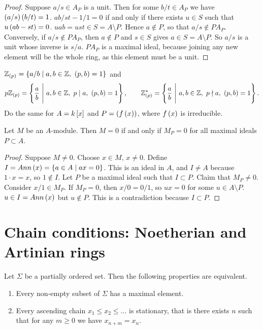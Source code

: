 \begin{proof}
Suppose $ a / s \in A_P $ is a unit. Then for some $ b / t \in A_P $ we have $ \rb{a / s}\rb{b / t} = 1 $. $ ab / st - 1 / 1 = 0 $ if and only if there exists $ u \in S $ such that $ u\rb{ab - st} = 0 $. $ uab = ust \in S = A \setminus P $. Hence $ a \notin P $, so that $ a / s \notin PA_P $. Conversely, if $ a / s \notin PA_P $, then $ a \notin P $ and $ s \in S $ gives $ a \in S = A \setminus P $. So $ a / s $ is a unit whose inverse is $ s / a $. $ PA_P $ is a maximal ideal, because joining any new element will be the whole ring, as this element must be a unit.
\end{proof}

\begin{example*}
$ \Z_{\rb{p}} = \cb{a / b \mid a, b \in \Z, \ \rb{p, b} = 1} $ and
$$ p\Z_{\rb{p}} = \cb{\dfrac{a}{b} \ \Bigg| \ a, b \in \Z, \ p \mid a, \ \rb{p, b} = 1}, \qquad \Z_{\rb{p}}^* = \cb{\dfrac{a}{b} \ \Bigg| \ a, b \in \Z, \ p \nmid a, \ \rb{p, b} = 1}. $$
Do the same for $ A = k\sb{x} $ and $ P = \rb{f\rb{x}} $, where $ f\rb{x} $ is irreducible.
\end{example*}

\begin{proposition}
Let $ M $ be an $ A $-module. Then $ M = 0 $ if and only if $ M_P = 0 $ for all maximal ideals $ P \subset A $.
\end{proposition}

\begin{proof}
Suppose $ M \ne 0 $. Choose $ x \in M $, $ x \ne 0 $. Define $ I = Ann\rb{x} = \cb{a \in A \mid ax = 0} $. This is an ideal in $ A $, and $ I \ne A $ because $ 1 \cdot x = x $, so $ 1 \notin I $. Let $ P $ be a maximal ideal such that $ I \subset P $. Claim that $ M_P \ne 0 $. Consider $ x / 1 \in M_P $. If $ M_P = 0 $, then $ x / 0 = 0 / 1 $, so $ ux = 0 $ for some $ u \in A \setminus P $. $ u \in I = Ann\rb{x} $ but $ u \notin P $. This is a contradiction because $ I \subset P $.
\end{proof}

\pagebreak

\section{Chain conditions: Noetherian and Artinian rings}


\begin{lemma}
Let $ \Sigma $ be a partially ordered set. Then the following properties are equivalent.
\begin{enumerate}
\item Every non-empty subset of $ \Sigma $ has a maximal element.
\item Every ascending chain $ x_1 \le x_2 \le \dots $ is stationary, that is there exists $ n $ such that for any $ m \ge 0 $ we have $ x_{n + m} = x_n $.
\end{enumerate}
\end{lemma}

